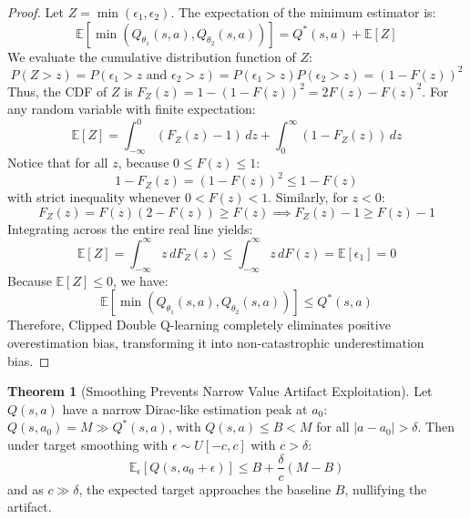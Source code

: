 \documentclass[11pt,a4paper]{article}
\theoremstyle{definition}
\newtheorem{theorem}{\textbf{Theorem}}[section]
\begin{document}
\begin{proof}
Let $Z = \min(\epsilon_1, \epsilon_2)$. The expectation of the minimum estimator is:
{\boldmath
\begin{equation}
\mathbb{E}\left[ \min(Q_{\theta_1}(s, a), Q_{\theta_2}(s, a)) \right] = Q^*(s, a) + \mathbb{E}[Z]
\end{equation}
}
We evaluate the cumulative distribution function of $Z$:
{\boldmath
\begin{equation}
P(Z > z) = P(\epsilon_1 > z \text{ and } \epsilon_2 > z) = P(\epsilon_1 > z) P(\epsilon_2 > z) = (1 - F(z))^2
\end{equation}
}
Thus, the CDF of $Z$ is $F_Z(z) = 1 - (1 - F(z))^2 = 2F(z) - F(z)^2$.
For any random variable with finite expectation:
{\boldmath
\begin{equation}
\mathbb{E}[Z] = \int_{-\infty}^0 (F_Z(z) - 1) \, dz + \int_0^\infty (1 - F_Z(z)) \, dz
\end{equation}
}
Notice that for all $z$, because $0 \le F(z) \le 1$:
{\boldmath
\begin{equation}
1 - F_Z(z) = (1 - F(z))^2 \le 1 - F(z)
\end{equation}
}
with strict inequality whenever $0 < F(z) < 1$.
Similarly, for $z < 0$:
{\boldmath
\begin{equation}
F_Z(z) = F(z)(2 - F(z)) \ge F(z) \implies F_Z(z) - 1 \ge F(z) - 1
\end{equation}
}
Integrating across the entire real line yields:
{\boldmath
\begin{equation}
\mathbb{E}[Z] = \int_{-\infty}^\infty z \, dF_Z(z) \le \int_{-\infty}^\infty z \, dF(z) = \mathbb{E}[\epsilon_1] = 0
\end{equation}
}
Because $\mathbb{E}[Z] \le 0$, we have:
{\boldmath
\begin{equation}
\mathbb{E}\left[ \min(Q_{\theta_1}(s, a), Q_{\theta_2}(s, a)) \right] \le Q^*(s, a)
\end{equation}
}
Therefore, Clipped Double Q-learning completely eliminates positive overestimation bias, transforming it into non-catastrophic underestimation bias.
\end{proof}

\begin{theorem}[Smoothing Prevents Narrow Value Artifact Exploitation]
Let $Q(s, a)$ have a narrow Dirac-like estimation peak at $a_0$: $Q(s, a_0) = M \gg Q^*(s, a)$, with $Q(s, a) \le B < M$ for all $|a - a_0| > \delta$. Then under target smoothing with $\epsilon \sim U[-c, c]$ with $c > \delta$:
{\boldmath
\begin{equation}
\mathbb{E}_{\epsilon}[Q(s, a_0 + \epsilon)] \le B + \frac{\delta}{c} (M - B)
\end{equation}
}
and as $c \gg \delta$, the expected target approaches the baseline $B$, nullifying the artifact.
\end{theorem}
\end{document}
